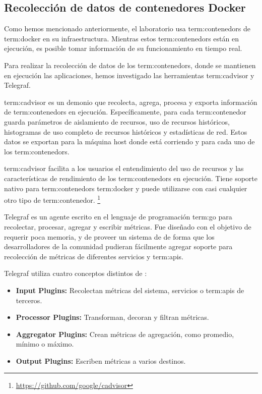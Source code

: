 \subsection{Recolección de datos de contenedores Docker}
\label{contenedores}

Como hemos mencionado anteriormente, el laboratorio usa \glspl{term:contenedor}
de \gls{term:docker} en su infraestructura. Mientras estos
\glspl{term:contenedor} están en ejecución, es posible tomar información de su
funcionamiento en tiempo real.

Para realizar la recolección de datos de los \glspl{term:contenedor}, donde se
mantienen en ejecución las aplicaciones, hemos investigado las herramientas
\gls{term:cadvisor} y Telegraf.

\gls{term:cadvisor} es un demonio que recolecta, agrega,
procesa y exporta información de \glspl{term:contenedor} en ejecución.
Específicamente, para cada \gls{term:contenedor} guarda parámetros de
aislamiento de recursos, uso de recursos históricos, histogramas de uso
completo de recursos históricos y estadísticas de red. Estos datos se exportan
para la máquina host donde está corriendo y para cada uno de los
\glspl{term:contenedor}.

\gls{term:cadvisor} facilita a los usuarios el entendimiento del uso de
recursos y las características de rendimiento de los \glspl{term:contenedor} en
ejecución.  Tiene soporte nativo para \glspl{term:contenedor} \gls{term:docker}
y puede utilizarse con casi cualquier otro tipo de \gls{term:contenedor}.
\footnote{\url{https://github.com/google/cadvisor}}

Telegraf es un agente escrito en el lenguaje de programación \gls{term:go} para
recolectar, procesar, agregar y escribir métricas. Fue diseñado con el objetivo
de requerir poca memoria, y de proveer un sistema de  de forma que
los desarrolladores de la comunidad pudieran fácilmente agregar soporte para
recolección de métricas de diferentes servicios y \glspl{term:api}.

Telegraf utiliza cuatro conceptos distintos de :

\begin{itemize}

  \item \textbf{Input Plugins:}
  Recolectan métricas del sistema, servicios o \glspl{term:api} de terceros.

  \item \textbf{Processor Plugins:}
  Transforman, decoran y filtran métricas.

  \item \textbf{Aggregator Plugins:}
  Crean métricas de agregación, como promedio, mínimo o máximo.

  \item \textbf{Output Plugins:}
  Escriben métricas a varios destinos.

\end{itemize}

